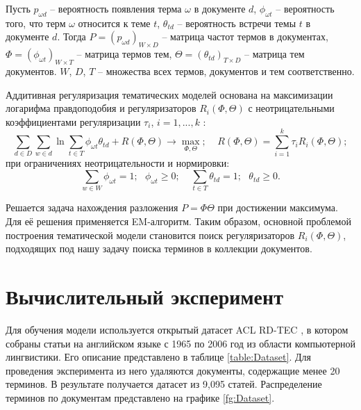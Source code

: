 \documentclass[a4paper, 12pt]{article}
\begin{document}
        Пусть $p_{\omega d}$ -- вероятность появления терма $\omega$ в документе $d$, $\phi_{\omega t}$ -- вероятность того, что терм $\omega$ относится к теме $t$, $\theta_{td}$ -- вероятность встречи темы $t$ в документе $d$. Тогда $P = (p_{\omega d})_{W \times D}$ -- матрица частот термов в документах, $\Phi = (\phi_{\omega t})_{W \times T}$ -- матрица термов тем, $\Theta = (\theta_{td})_{T \times D}$ -- матрица тем документов. $W$, $D$, $T$ -- множества всех термов, документов и тем соответственно.
       
        Аддитивная регуляризация тематических моделей основана на максимизации логарифма правдоподобия и регуляризаторов $R_i(\Phi, \Theta)$ с неотрицательными коэффициентами регуляризации $\tau_i$, $i = 1, ..., k$ \citep{vorontsov2020}:
        \begin{equation}\label{log}
            \sum\limits_{d \in D}\sum\limits_{w \in d}\ln\sum\limits_{t \in T}\phi_{\omega t}\theta_{td} + R(\Phi, \Theta) \to \max\limits_{\Phi, \Theta}; ~~~~~ R(\Phi, \Theta) = \sum\limits_{i = 1}^k\tau_iR_i(\Phi, \Theta);
        \end{equation}
        при ограничениях неотрицательности и нормировки:
        \begin{equation}\label{lim}
            \sum\limits_{w \in W}\phi_{\omega t} = 1; ~~~ \phi_{\omega t} \geq 0; ~~~~~ \sum\limits_{t \in T}\theta_{td} = 1; ~~~ \theta_{td} \geq 0.
        \end{equation}

    Решается задача нахождения разложения $P = \Phi\Theta$ при достижении максимума. Для её решения применяется EM-алгоритм. Таким образом, основной проблемой построения тематической модели становится поиск регуляризаторов $R_i(\Phi, \Theta)$, подходящих под нашу задачу поиска терминов в коллекции документов.

\section{Вычислительный эксперимент}

    Для обучения модели используется открытый датасет ACL RD-TEC \citep{QZadeh2014}, в котором собраны статьи на английском языке с 1965 по 2006 год из области компьютерной лингвистики. Его описание представлено в таблице \ref{table:Dataset}. Для проведения эксперимента из него удаляются документы, содержащие менее 20 терминов. В результате получается датасет из 9,095 статей. Распределение терминов по документам представлено на графике \ref{fg:Dataset}.
\end{document}
